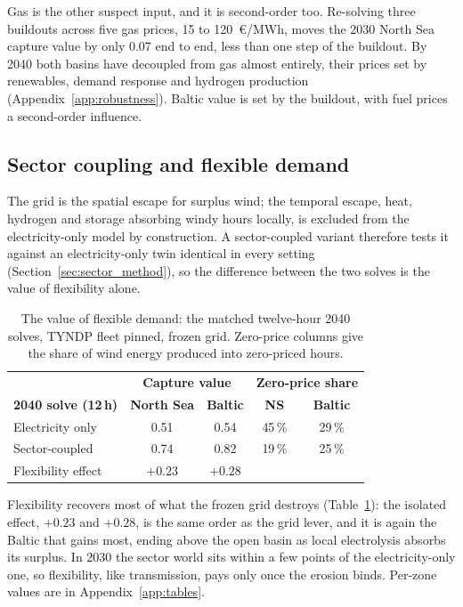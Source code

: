 Gas is the other suspect input, and it is second-order too. Re-solving three
buildouts across five gas prices, 15 to 120~\euro/MWh, moves the 2030 North
Sea capture value by only 0.07 end to end, less than one step of the buildout.
By 2040 both basins have decoupled from gas almost entirely, their prices set by renewables, demand response and hydrogen production
(Appendix~\ref{app:robustness}). Baltic value is set by the buildout, with fuel prices a second-order
influence.

\subsection{Sector coupling and flexible demand}\label{sec:sector_results}

The grid is the spatial escape for surplus wind; the temporal escape, heat,
hydrogen and storage absorbing windy hours locally, is excluded from the
electricity-only model by construction. A sector-coupled variant therefore
tests it against an electricity-only twin identical in every setting
(Section~\ref{sec:sector_method}), so the difference between the two solves
is the value of flexibility alone.

\begin{table}[!htb]
\centering
\caption{The value of flexible demand: the matched twelve-hour 2040 solves,
    TYNDP fleet pinned, frozen grid. Zero-price columns give the share of wind
    energy produced into zero-priced hours.}
\label{tab:sector}
\begin{tabular}{l c c c c}
\toprule
& \multicolumn{2}{c}{\textbf{Capture value}} &
\multicolumn{2}{c}{\textbf{Zero-price share}} \\
\textbf{2040 solve (12\,h)} & \textbf{North Sea} & \textbf{Baltic} &
\textbf{NS} & \textbf{Baltic} \\
\midrule
Electricity only & 0.51 & 0.54 & 45\,\% & 29\,\% \\
Sector-coupled   & 0.74 & 0.82 & 19\,\% & 25\,\% \\
Flexibility effect & $+0.23$ & $+0.28$ & & \\
\bottomrule
\end{tabular}
\end{table}

Flexibility recovers most of what the frozen grid destroys
(Table~\ref{tab:sector}): the isolated effect, $+0.23$ and $+0.28$, is the
same order as the grid lever, and it is again the Baltic that gains most,
ending above the open basin as local electrolysis absorbs its surplus. In 2030
the sector world sits within a few points of the electricity-only one, so
flexibility, like transmission, pays only once the erosion binds. Per-zone
values are in Appendix~\ref{app:tables}.

